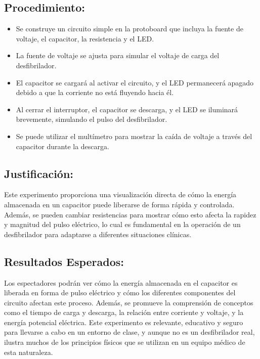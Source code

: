 \subsection{Procedimiento:}
\begin{itemize}
    \item Se construye un circuito simple en la protoboard que incluya la fuente de voltaje, el capacitor, la resistencia y el LED.
    \item La fuente de voltaje se ajusta para simular el voltaje de carga del desfibrilador.
    \item El capacitor se cargará al activar el circuito, y el LED permanecerá apagado debido a que la corriente no está fluyendo hacia él.
    \item Al cerrar el interruptor, el capacitor se descarga, y el LED se iluminará brevemente, simulando el pulso del desfibrilador.
    \item Se puede utilizar el multímetro para mostrar la caída de voltaje a través del capacitor durante la descarga.
\end{itemize}

\subsection{Justificación:}
Este experimento proporciona una visualización directa de cómo la energía almacenada en un capacitor puede liberarse de forma rápida y controlada. Además, se pueden cambiar resistencias para mostrar cómo esto afecta la rapidez y magnitud del pulso eléctrico, lo cual es fundamental en la operación de un desfibrilador para adaptarse a diferentes situaciones clínicas.

\subsection{Resultados Esperados:}
Los espectadores podrán ver cómo la energía almacenada en el capacitor es liberada en forma de pulso eléctrico y cómo los diferentes componentes del circuito afectan este proceso. Además, se promueve la comprensión de conceptos como el tiempo de carga y descarga, la relación entre corriente y voltaje, y la energía potencial eléctrica.\newline \hfill \break
Este experimento es relevante, educativo y seguro para llevarse a cabo en un entorno de clase, y aunque no es un desfibrilador real, ilustra muchos de los principios físicos que se utilizan en un equipo médico de esta naturaleza.

